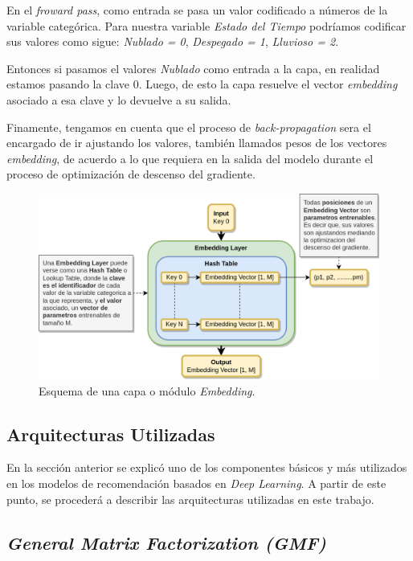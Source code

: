 \documentclass[11pt,a4paper,twoside]{thesis}
\begin{document}
En el \textit{froward pass}, como entrada se pasa un valor codificado a números
de la variable categórica. Para nuestra variable \textit{Estado del Tiempo}
podríamos codificar sus valores como sigue: \textit{Nublado = 0},
\textit{Despegado = 1}, \textit{Lluvioso = 2}.

Entonces si pasamos el valores \textit{Nublado} como entrada a la capa, en
realidad estamos pasando la clave 0. Luego, de esto la capa resuelve el vector
\textit{embedding} asociado a esa clave y lo devuelve a su salida.

Finamente, tengamos en cuenta que el proceso de \textit{back-propagation} sera
el encargado de ir ajustando los valores, también llamados pesos de los
vectores \textit{embedding}, de acuerdo a lo que requiera en la salida del
modelo durante el proceso de optimización de descenso del gradiente.

\begin{figure}[ht!]
	\centering
	\includegraphics[width=13cm]{./images/Embedding-Layer.png}
	\caption{Esquema de una capa o módulo \textit{Embedding}.}
	\label{fig:embeddingLayer}
\end{figure}

\clearpage

\subsection{Arquitecturas Utilizadas}

En la sección anterior se explicó uno de los componentes básicos y más
utilizados en los modelos de recomendación basados en \textit{Deep Learning}. A
partir de este punto, se procederá a describir las arquitecturas utilizadas en
este trabajo.

\subsection{\textit{General Matrix Factorization (GMF)}}
\end{document}
